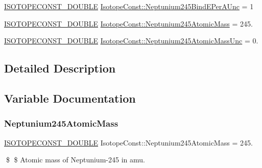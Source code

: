 \begin{DoxyCompactItemize}
\mbox{\hyperlink{group___isotope_const-_macros_ga8f45a7272ce02c0b4c65c44636ed719a}{I\+S\+O\+T\+O\+P\+E\+C\+O\+N\+S\+T\+\_\+\+D\+O\+U\+B\+LE}} \mbox{\hyperlink{group___isotope_const-_neptunium-_np245_ga7e03f83b271e4b22a377e98750c1a90d}{Isotope\+Const\+::\+Neptunium245\+Bind\+E\+Per\+A\+Unc}} = 1
\item 
\mbox{\hyperlink{group___isotope_const-_macros_ga8f45a7272ce02c0b4c65c44636ed719a}{I\+S\+O\+T\+O\+P\+E\+C\+O\+N\+S\+T\+\_\+\+D\+O\+U\+B\+LE}} \mbox{\hyperlink{group___isotope_const-_neptunium-_np245_ga975e54ac698772c26a09afdb0dcf20e7}{Isotope\+Const\+::\+Neptunium245\+Atomic\+Mass}} = 245.
\item 
\mbox{\hyperlink{group___isotope_const-_macros_ga8f45a7272ce02c0b4c65c44636ed719a}{I\+S\+O\+T\+O\+P\+E\+C\+O\+N\+S\+T\+\_\+\+D\+O\+U\+B\+LE}} \mbox{\hyperlink{group___isotope_const-_neptunium-_np245_gacb1c0722a1ab1e1e5a61f17227f97cc2}{Isotope\+Const\+::\+Neptunium245\+Atomic\+Mass\+Unc}} = 0.
\end{DoxyCompactItemize}


\subsection{Detailed Description}


\subsection{Variable Documentation}
\mbox{\label{group___isotope_const-_neptunium-_np245_ga975e54ac698772c26a09afdb0dcf20e7}} 
\subsubsection{\texorpdfstring{Neptunium245\+Atomic\+Mass}{Neptunium245AtomicMass}}
{\footnotesize\ttfamily \mbox{\hyperlink{group___isotope_const-_macros_ga8f45a7272ce02c0b4c65c44636ed719a}{I\+S\+O\+T\+O\+P\+E\+C\+O\+N\+S\+T\+\_\+\+D\+O\+U\+B\+LE}} Isotope\+Const\+::\+Neptunium245\+Atomic\+Mass = 245.}

\$ \$ Atomic mass of Neptunium-\/245 in amu. \mbox{\label{group___isotope_const-_neptunium-_np245_gacb1c0722a1ab1e1e5a61f17227f97cc2}} 
